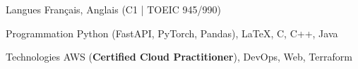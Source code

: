 

\begin{cvskills}

  \cvskill
    {Langues} %
    {Français, Anglais (C1 | TOEIC 945/990)} %

  \cvskill
    {Programmation} %
    {Python (FastAPI, PyTorch, Pandas), \LaTeX, C, C++, Java} %

  \cvskill
    {Technologies} %
    {AWS (\textbf{Certified Cloud Practitioner}), DevOps, Web, Terraform} %

\end{cvskills}
